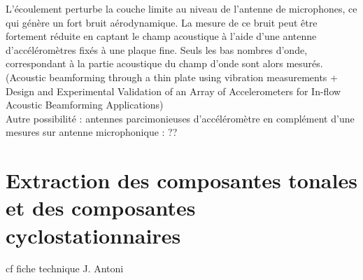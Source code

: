 L'écoulement perturbe la couche limite au niveau de l'antenne de microphones, ce qui génère un fort bruit aérodynamique. La mesure de ce bruit peut être fortement réduite en captant le champ acoustique à l'aide d'une antenne d'accéléromètres fixés à une plaque fine. Seuls les bas nombres d'onde, correspondant à la partie acoustique du champ d'onde sont alors mesurés. (Acoustic beamforming through a thin plate using vibration measurements  +   Design and Experimental Validation of an Array of Accelerometers for In-flow Acoustic Beamforming Applications) \\


Autre possibilité : antennes parcimonieuses d'accéléromètre en complément d'une mesures sur antenne microphonique : ??

\section{Extraction des composantes tonales et des composantes cyclostationnaires}
cf fiche technique J. Antoni


